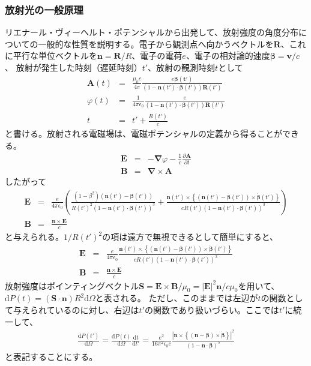 \documentclass[a4paper,11pt,uplatex]{jsbook}
\begin{document}
\subsubsection{放射光の一般原理}\label{sec:general radiation}
リエナール・ヴィーヘルト・ポテンシャルから出発して、放射強度の角度分布についての一般的な性質を説明する。電子から観測点へ向かうベクトルを$\bm{R}$、これに平行な単位ベクトルを$\bm{n} = \bm{R}/R$、電子の電荷$e$、電子の相対論的速度$\bm{\beta} = \bm{v}/c$、
放射が発生した時刻（遅延時刻）$t'$、放射の観測時刻$t$として
\begin{eqnarray}
  \bm{A}(t) &=& \frac{\mu_0 c}{4\pi}\frac{e\bm{\beta(t')}}{(1-\bm{n}(t')\cdot\bm{\beta}(t'))\bm{R}(t')}\label{retarded potential}\\
  \varphi(t) &=& \frac{1}{4\pi \epsilon_0}\frac{e}{(1-\bm{n}(t')\cdot\bm{\beta}(t'))\bm{R}(t')}\label{retarded potential phi}\\
  t &=& t' + \frac{R(t')}{c}
\end{eqnarray}
と書ける。放射される電磁場は、電磁ポテンシャルの定義から得ることができる。
\begin{eqnarray}
  \bm{E} &=& -\bm{\nabla} \varphi - \frac{1}{c}\frac{\partial \bm{A}}{\partial t}\\
  \bm{B} &=& \bm{\nabla} \times \bm{A}
\end{eqnarray}
したがって
\begin{eqnarray}
  \bm{E} &=& \frac{e}{4\pi \epsilon_0}\left( \frac{(1-\beta^2)(\bm{n}(t')-\bm{\beta}(t'))}{R(t')^2(1-\bm{n}(t')\cdot\bm{\beta}(t'))^3}+
  \frac{\bm{n}(t')\times \left\{ (\bm{n}(t')-\bm{\beta}(t'))\times \bm{\dot{\beta}}(t')\right\}}{cR(t')(1-\bm{n}(t')\cdot\bm{\beta}(t'))^3} \right)\\
  \bm{B} &=& \frac{\bm{n}\times\bm{E}}{c}
\end{eqnarray}
と与えられる。$1/R(t')^2$の項は遠方で無視できるとして簡単にすると、
\begin{eqnarray}\label{eq:e field}
  \bm{E} &=& \frac{e}{4\pi \epsilon_0}\frac{\bm{n}(t')\times \left\{ (\bm{n}(t')-\bm{\beta}(t'))\times \bm{\dot{\beta}}(t')\right\}}{cR(t')(1-\bm{n}(t')\cdot\bm{\beta}(t'))^3}\\
  \bm{B} &=& \frac{\bm{n}\times\bm{E}}{c}
\end{eqnarray}
放射強度はポインティングベクトル$\bm{S} =\bm{E}\times \bm{B}/\mu_0 = |\bm{E}|^2\bm{n}/c\mu_0$を用いて、$\text{d}P(t) = (\bm{S}\cdot\bm{n})R^2\text{d}\Omega$と表される。
ただし、このままでは左辺が$t$の関数として与えられているのに対し、右辺は$t'$の関数であり扱いづらい。ここでは$t'$に統一して、
\begin{eqnarray} \label{eq:power}
  \frac{\text{d}P(t')}{\text{d}\Omega} = \frac{\text{d}P(t)}{\text{d}\Omega}\frac{\text{d}t}{\text{d}t'} = \frac{e^2}{16\pi^2 \epsilon_0 c}\frac{\left|\bm{n}\times \left\{ (\bm{n}-\bm{\beta})\times \bm{\dot{\beta}}\right\}\right|^2}{(1-\bm{n}\cdot\bm{\beta})^5}
\end{eqnarray}
と表記することにする。
\end{document}
